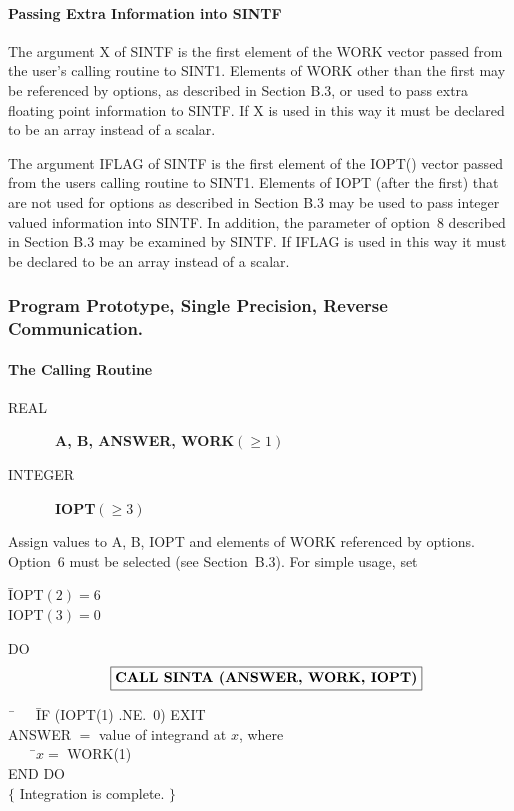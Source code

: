 \documentclass[twoside]{MATH77}
\begin{document}
\paragraph{Passing Extra Information into SINTF\label{ExSINTF}}

The argument X of SINTF is the first element of the WORK vector passed from
the user's calling routine to SINT1. Elements of WORK other than the first
may be referenced by options, as described in Section B.3, or used to pass
extra floating point information to SINTF. If X is used in this way it must
be declared to be an array instead of a scalar.

The argument IFLAG of SINTF is the first element of the IOPT() vector
passed from the users calling routine to SINT1. Elements of IOPT
(after the first) that are not used for options as described in
Section B.3 may be used to pass integer valued information into
SINTF. In addition, the parameter of option~8 described in Section
B.3 may be examined by SINTF. If IFLAG is used in this way it must be
declared to be an array instead of a scalar.
\subsubsection{Program Prototype, Single Precision, Reverse Communication.%
\label{PPRC}}
\paragraph{The Calling Routine\label{CallingRC}}
\begin{description}
\item[REAL]  \ {\bf A, B, ANSWER, WORK$(\geq 1)$}
\item[INTEGER]  \ {\bf IOPT$(\geq 3)$}
\end{description}
Assign values to A, B, IOPT and elements of WORK referenced by options.
Option~6 must be selected (see Section~B.3). For simple usage, set
\begin{tabbing}
\hspace{.2in}\=IOPT$(2) = 6$\\
\>IOPT$(3) = 0$
\end{tabbing}
\begin{center}\vspace{-5pt}
\end{center}\vspace{-5pt}
\hspace{.2in}DO
$$
\quad \fbox{{\bf CALL SINTA (ANSWER, WORK, IOPT)}}
$$\vspace{-20pt}
\begin{tabbing}
\hspace{.2in}\=\ \ \ \ \=IF (IOPT(1) .NE.\ 0) EXIT\\
\>\>ANSWER $=$ value of integrand at $x$, where\\
\>\>\ \ \ \ \=$x =$ WORK(1)\\
\>END DO\\
\>$\{$ Integration is complete. $\}$
\end{tabbing}
\end{document}
